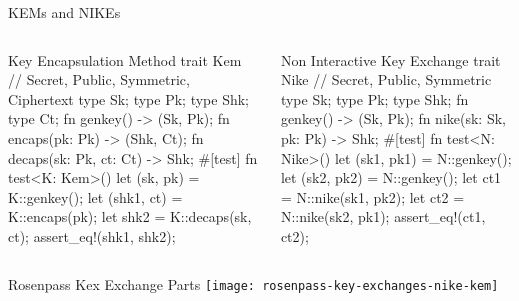 \begin{frame}[fragile,T]{KEMs and NIKEs}
  \begin{columns}[t,fullwidth]
    \begin{column}{.48\linewidth}
\begin{rustblock}{Key Encapsulation Method}
trait Kem {
  // Secret, Public, Symmetric, Ciphertext
  type Sk; type Pk; type Shk; type Ct;
  fn genkey() -> (Sk, Pk);
  fn encaps(pk: Pk) -> (Shk, Ct);
  fn decaps(sk: Pk, ct: Ct) -> Shk;
}
#[test]
fn test<K: Kem>() {
  let (sk, pk) = K::genkey();
  let (shk1, ct) = K::encaps(pk);
  let shk2 = K::decaps(sk, ct);
  assert_eq!(shk1, shk2);
}
\end{rustblock}
    \end{column}\hfill
    \begin{column}{.48\linewidth}
\begin{rustblock}{Non Interactive Key Exchange}
trait Nike {
  // Secret, Public, Symmetric
  type Sk; type Pk; type Shk;
  fn genkey() -> (Sk, Pk);
  fn nike(sk: Sk, pk: Pk) -> Shk;
}
#[test]
fn test<N: Nike>() {
  let (sk1, pk1) = N::genkey();
  let (sk2, pk2) = N::genkey();
  let ct1 = N::nike(sk1, pk2);
  let ct2 = N::nike(sk2, pk1);
  assert_eq!(ct1, ct2);
}
\end{rustblock}
    \end{column}

  \end{columns}
\end{frame}

\begin{frame}{Rosenpass Kex Exchange Parts}
  \centering
  \texttt{[image: rosenpass-key-exchanges-nike-kem]}
\end{frame}








